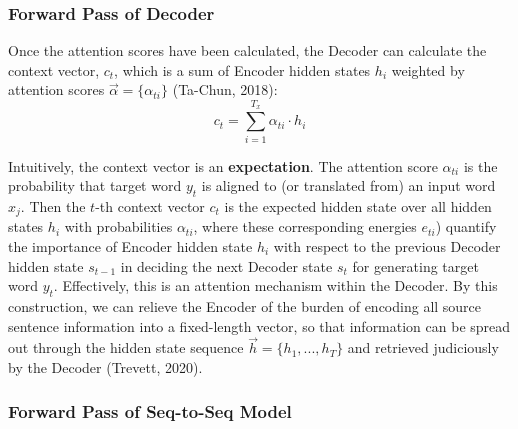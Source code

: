 

\subsubsection{Forward Pass of Decoder}

Once the attention scores have been calculated, the Decoder can calculate the context vector, $c_t$, which is a sum of Encoder hidden states $h_i$ weighted by attention scores $\overrightarrow{\alpha} = \Big \{ \alpha_{ti} \Big \}$ (Ta-Chun, 2018): 
$$
c_t = \sum_{i=1}^{T_x} \alpha_{ti} \cdot h_i
$$

Intuitively, the context vector is an \textbf{expectation}. The attention score $\alpha_{ti}$ is the probability that target word $y_t$ is aligned to (or translated from) an input word $x_j$. Then the $t$-th context vector $c_t$ is the expected hidden state over all hidden states $h_i$ with probabilities $\alpha_{ti}$, where these corresponding energies $e_{ti}$) quantify the importance of Encoder hidden state $h_i$ with respect to the previous Decoder hidden state $s_{t-1}$ in deciding the next Decoder state $s_t$ for generating target word $y_t$. 
\newline Effectively, this is an attention mechanism within the Decoder. By this construction, we can relieve the Encoder of the burden of encoding all source sentence information into a fixed-length vector, so that information can be spread out through the hidden state sequence $\overrightarrow{h} = \Big \{ h_1,...,h_T\Big \}$ and retrieved judiciously by the Decoder (Trevett, 2020). 



\subsubsection{Forward Pass of Seq-to-Seq Model}

